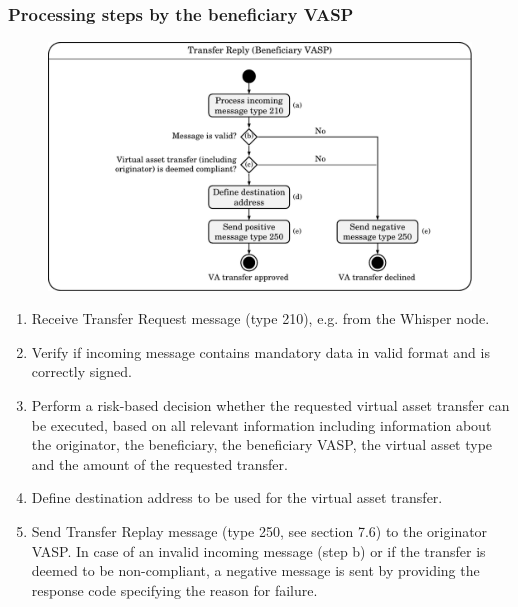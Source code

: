 \documentclass{article}
\begin{document}
\subsubsection{Processing steps by the beneficiary VASP}
\begin{figure}[h]
    \centering
    \includegraphics[width=\textwidth]{g12.pdf}
\end{figure}
\begin{enumerate}
    \item Receive Transfer Request message (type 210), e.g. from the Whisper node.
    \item Verify if incoming message contains mandatory data in valid format and is correctly signed.
    \item Perform a risk-based decision whether the requested virtual asset transfer can be executed, based on all relevant information including information about the originator, the beneficiary, the beneficiary VASP, the virtual asset type and the amount of the requested transfer.
    \item Define destination address to be used for the virtual asset transfer.
    \item Send Transfer Replay message (type 250, see section 7.6) to the originator VASP. In case of an invalid incoming message (step b) or if the transfer is deemed to be non-compliant, a negative message is sent by providing the response code specifying the reason for failure.
\end{enumerate}
\end{document}

